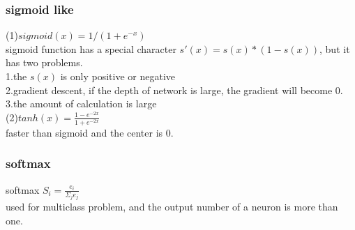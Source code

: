 \documentclass[12pt]{article}
\begin{document}
\subsubsection*{sigmoid like}
(1)$sigmoid(x)=1/(1+e^{-x})$\\
sigmoid function has a special character $s'(x)=s(x)*(1-s(x))$, but it has two problems.\\
 1.the $s(x)$ is only positive or negative\\
 2.gradient descent, if the depth of network is large, the gradient will     become 0.\\
 3.the amount of calculation is large\\
(2)$tanh(x)=\frac{1-e^{-2x}}{1+e^{-2x}}$\\
faster than sigmoid and the center is 0.
\subsubsection{softmax}
softmax $S_i=\frac{e_i}{\Sigma_{j}{e_j}}$\\
used for multiclass problem, and the output number of  a neuron is more than one.
\end{document}
